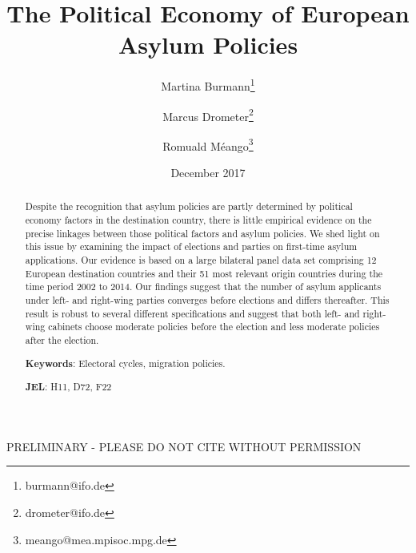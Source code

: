 \documentclass[a4paper,12pt]{article}
\title{The Political Economy of European Asylum Policies}
\date{December 2017}
\author[,1]{Martina Burmann\thanks{burmann@ifo.de}}
\author[,1]{Marcus Drometer\thanks{drometer@ifo.de}}
\author[,2]{Romuald M\'eango\thanks{meango@mea.mpisoc.mpg.de}}
\affil[1]{ifo Institute for Economic Research, Munich}
\affil[2]{Munich Center for the Economics of Aging (MEA)}
\begin{document}
      \maketitle

\begin{center}
PRELIMINARY - PLEASE DO NOT CITE WITHOUT PERMISSION
\end{center}
\begin{abstract}
\singlespacing
\noindent 
Despite the recognition that asylum policies are partly determined by political economy factors in the destination country, there is little empirical evidence on the precise linkages between those political factors and asylum policies. We shed light on this issue by examining the impact of elections and parties on first-time asylum applications.  Our evidence is based on a large bilateral panel data set comprising 12 European destination countries and their 51 most relevant origin countries during the time period 2002 to 2014. Our findings suggest that  the number of asylum applicants under left- and right-wing parties converges before elections and differs thereafter. This result is robust to several different specifications and suggest that both left- and right-wing cabinets choose moderate policies before the election and less moderate policies after the election.

\bigskip

\textbf{Keywords}: Electoral cycles, migration policies.

\textbf{JEL}: H11, D72, F22

\bigskip
\end{abstract}
\setcounter{page}{0} \renewcommand{\thepage}{}
\pagebreak{}\pagebreak

\end{document}
